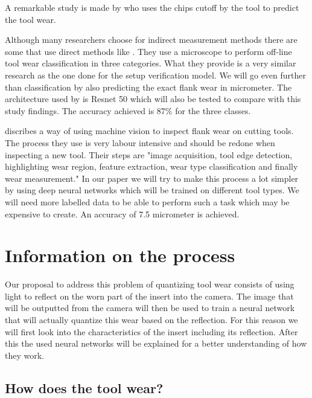 		A remarkable study is made by \cite{Pagani2020} who uses the chips cutoff by the tool to predict the tool wear. 
           
           
           Although many researchers choose for indirect measurement methods there are some that use direct methods like \cite{Ambadekar2020}. They use a microscope to perform off-line tool wear classification in three categories. What they provide is a very similar research as the one done for the setup verification model. We will go even further than classification by also predicting the exact flank wear in micrometer. The architecture used by \citeauthor{Ambadekar2020} is Resnet 50 which will also be tested to compare with this study findings. The accuracy achieved is 87\% for the three classes.
           
                 \cite{Schmitt2012} discribes a way of using machine vision to inspect flank wear on cutting tools. The process they use is very labour intensive and should be redone when inspecting a new tool. Their steps are "image acquisition, tool edge detection, highlighting wear region, feature extraction, wear type classification and finally wear measurement." In our paper we will try to make this process a lot simpler by using deep neural networks which will be trained on different tool types. We will need more labelled data to be able to perform such a task which may be expensive to create. An accuracy of 7.5 micrometer is achieved.
         

            
\section{Information on the process}
\label{sec:lit:reflection}

Our proposal to address this problem of quantizing tool wear consists of using light to reflect on the worn part of the insert into the camera. The image that will be outputted from the camera will then be used to train a neural network that will actually quantize this wear based on the reflection. For this reason we will first look into the characteristics of the insert including its reflection. After this the used neural networks will be explained for a better understanding of how they work.

\subsection{How does the tool wear?}
	
